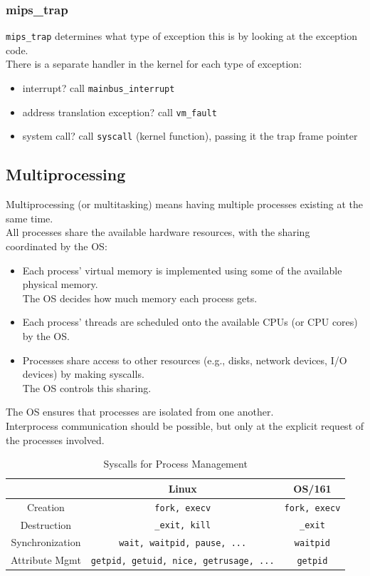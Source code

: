 \documentclass[12pt]{article}
\theoremstyle{plain}
\theoremstyle{definition}
\begin{document}
\subsubsection{mips\_trap}
\texttt{mips\_trap} determines what type of exception this is by looking at the exception code. \\
There is a separate handler in the kernel for each type of exception:
\begin{itemize}
  \item interrupt? call \texttt{mainbus\_interrupt}
  \item address translation exception? call \texttt{vm\_fault}
  \item system call? call \texttt{syscall} (kernel function), passing it the trap frame pointer
\end{itemize}

\subsection{Multiprocessing}
Multiprocessing (or multitasking) means having multiple processes existing at the same time. \\

All processes share the available hardware resources, with the sharing coordinated by the OS:
\begin{itemize}
  \item Each process' virtual memory is implemented using some of the available physical memory. \\
  The OS decides how much memory each process gets.
  \item Each process' threads are scheduled onto the available CPUs (or CPU cores) by the OS.
  \item Processes share access to other resources (e.g., disks, network devices, I/O devices) by making syscalls. \\
  The OS controls this sharing.
\end{itemize}

The OS ensures that processes are isolated from one another. \\
Interprocess communication should be possible, but only at the explicit request of the processes involved.

\begin{table}[H]
  \vspace{-15pt}
  \caption{Syscalls for Process Management}
  \label{tab:syscall_pmanage}
  \centering

  \begin{tabular}{|c||c|c|}
  \hline
  & Linux & OS/161 \\ \hline
  Creation & \texttt{fork, execv} & \texttt{fork, execv} \\ \hline
  Destruction & \texttt{\_exit, kill} & \texttt{\_exit} \\ \hline
  Synchronization & \texttt{wait, waitpid, pause, ...} & \texttt{waitpid} \\ \hline
  Attribute Mgmt & \texttt{getpid, getuid, nice, getrusage, ...} & \texttt{getpid} \\ \hline
  \end{tabular}
\end{table}
\end{document}
